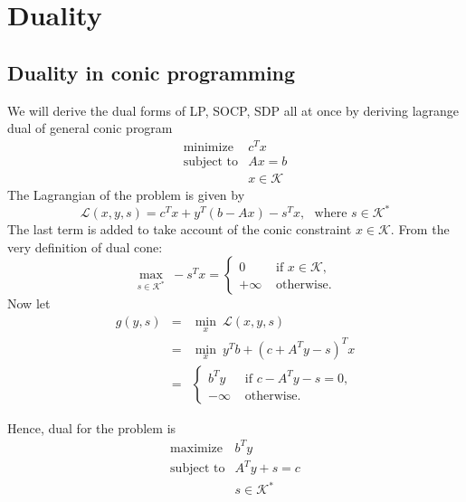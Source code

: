 \documentclass[10pt,oneside]{book}
\theoremstyle{definition}
\begin{document}
\section{Duality}


\subsection{Duality in conic programming}

We will derive the dual forms of LP, SOCP, SDP all at once by deriving lagrange dual of general conic program
\begin{equation}
\begin{array}{ll}
\mbox{minimize} & c^Tx\\
\mbox{subject to}& Ax = b\\
& x \in \mathcal{K}
\end{array} 
\end{equation}
The Lagrangian of the problem is given by 
\begin{equation}
\mathcal{L}(x,y,s) = c^Tx + y^T(b-Ax) - s^Tx, \ \ \ \mbox{where } s\in \mathcal{K}^*
\end{equation}
The last term is added to take account of the conic constraint $x\in \mathcal{K}$. From the very definition of dual cone:
\begin{equation}
\max_{s\in \mathcal{K}^*} \ -s^Tx = 
\left\lbrace \begin{array}{ll} 
0 & \mbox{ if } x\in\mathcal{K},\\ 
+\infty & \mbox{ otherwise.}
\end{array}\right. 
\end{equation}
Now let 
\begin{eqnarray}
g(y,s) &=& \min_x \ \mathcal{L}(x,y,s) \\
&=& \min_x \ y^Tb + (c+A^Ty -s)^Tx \\
&=& \left\lbrace \begin{array}{ll} 
b^Ty & \mbox{ if } c-A^Ty - s = 0,\\ 
-\infty & \mbox{ otherwise.}
\end{array}\right. 
\end{eqnarray}

Hence, dual for the problem is 
\begin{equation}
 \begin{array}{ll}
\mbox{maximize} & b^Ty\\
\mbox{subject to}& A^Ty + s = c\\
& s \in \mathcal{K}^*
\end{array}
\end{equation}
\end{document}

